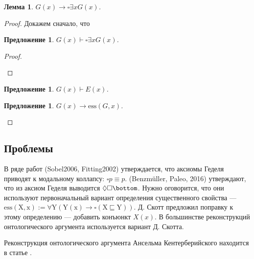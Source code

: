 \documentclass[openany]{book}
\theoremstyle{plain}
\newtheorem{lem}[thm]{Лемма}
\newtheorem{prop}[thm]{Предложение}
\theoremstyle{definition}
\begin{document}
\begin{lem}
\(G(x) \to \square \exists x G(x)\).
\end{lem}
\begin{proof}
Докажем сначало, что 
\begin{prop}
\(G(x) \vdash \square \exists x G(x)\).
\end{prop}
\begin{proof}
\begin{prooftree}
\end{prooftree}
\end{proof}

\begin{prop}
\(G(x) \vdash E(x)\).
\end{prop}

\begin{prop}
\(G(x) \to \mathrm{ess}(G, x)\).
\end{prop}

\end{proof}

\subsection{Проблемы}

В ряде работ (Sobel2006, Fitting2002) утверждается, что аксиомы Геделя приводят к модальному коллапсу: \(\square p \equiv p\). (Benzm\"{u}ller, Paleo, 2016) утверждают, что из аксиом Геделя выводится \(\Diamond \square \bottom\). Нужно оговорится, что они используют первоначальный вариант определения существенного свойства --- \(\mathrm{ess(X, x) := \forall Y (Y(x) \to \square (X \sqsubseteq Y))}\). Д. Скотт предложил поправку к этому определению --- добавить конъюнкт \(X(x)\). В большинстве реконструкций онтологического аргумента используется вариант Д. Скотта.

Реконструкция онтологического аргумента Ансельма Кентерберийского находится в статье \cite{Ramharter}.
\end{document}
